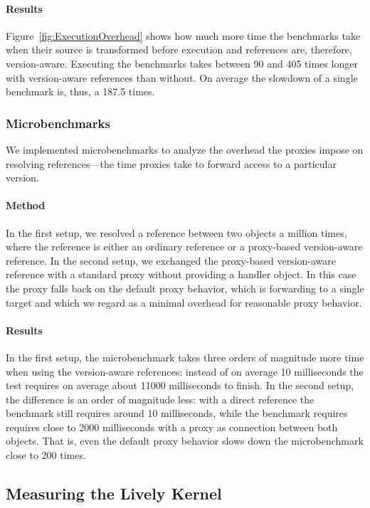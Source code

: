 \paragraph{Results}
Figure~\ref{fig:ExecutionOverhead} shows how much more time the benchmarks take when their source is transformed before execution and references are, therefore, version-aware.
Executing the benchmarks takes between 90 and 405 times longer with version-aware references than without.
On average the slowdown of a single benchmark is, thus, a 187.5 times.


\subsubsection{Microbenchmarks}

We implemented microbenchmarks to analyze the overhead the proxies impose on resolving references---the time proxies take to forward access to a particular version.

\paragraph{Method}
In the first setup, we resolved a reference between two objects a million times, where the reference is either an ordinary reference or a proxy-based version-aware reference.
In the second setup, we exchanged the proxy-based version-aware reference with a standard proxy without providing a handler object.
In this case the proxy falls back on the default proxy behavior, which is forwarding to a single target and which we regard as a minimal overhead for reasonable proxy behavior. 

\paragraph{Results}
In the first setup, the microbenchmark takes three orders of magnitude more time when using the version-aware references: instead of on average 10 milliseconds the test requires on average about 11000 milliseconds to finish.
In the second setup, the difference is an order of magnitude less: with a direct reference the benchmark still requires around 10 milliseconds, while the benchmark requires requires close to 2000 milliseconds with a proxy as connection between both objects.
That is, even the default proxy behavior slows down the microbenchmark close to 200 times.



\subsection{Measuring the Lively Kernel}

